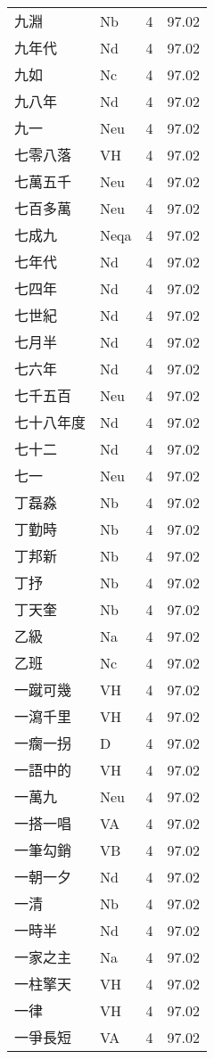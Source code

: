 \documentclass[twocolumn]{book}
\begin{document}
\begin{supertabular}{llrr}
九淵 & Nb & 4 &  97.02\\
九年代 & Nd & 4 &  97.02\\
九如 & Nc & 4 &  97.02\\
九八年 & Nd & 4 &  97.02\\
九一 & Neu & 4 &  97.02\\
七零八落 & VH & 4 &  97.02\\
七萬五千 & Neu & 4 &  97.02\\
七百多萬 & Neu & 4 &  97.02\\
七成九 & Neqa & 4 &  97.02\\
七年代 & Nd & 4 &  97.02\\
七四年 & Nd & 4 &  97.02\\
七世紀 & Nd & 4 &  97.02\\
七月半 & Nd & 4 &  97.02\\
七六年 & Nd & 4 &  97.02\\
七千五百 & Neu & 4 &  97.02\\
七十八年度 & Nd & 4 &  97.02\\
七十二 & Nd & 4 &  97.02\\
七一 & Neu & 4 &  97.02\\
丁磊淼 & Nb & 4 &  97.02\\
丁勤時 & Nb & 4 &  97.02\\
丁邦新 & Nb & 4 &  97.02\\
丁抒 & Nb & 4 &  97.02\\
丁天奎 & Nb & 4 &  97.02\\
乙級 & Na & 4 &  97.02\\
乙班 & Nc & 4 &  97.02\\
一蹴可幾 & VH & 4 &  97.02\\
一瀉千里 & VH & 4 &  97.02\\
一瘸一拐 & D & 4 &  97.02\\
一語中的 & VH & 4 &  97.02\\
一萬九 & Neu & 4 &  97.02\\
一搭一唱 & VA & 4 &  97.02\\
一筆勾銷 & VB & 4 &  97.02\\
一朝一夕 & Nd & 4 &  97.02\\
一清 & Nb & 4 &  97.02\\
一時半 & Nd & 4 &  97.02\\
一家之主 & Na & 4 &  97.02\\
一柱擎天 & VH & 4 &  97.02\\
一律 & VH & 4 &  97.02\\
一爭長短 & VA & 4 &  97.02\\

\end{supertabular}
\end{document}
